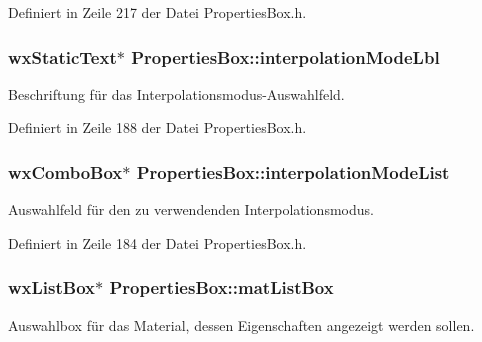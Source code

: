 Definiert in Zeile 217 der Datei Properties\-Box.\-h.

\hypertarget{classPropertiesBox_a7184c404a73e32cee30ac299ef9fe649}{
\subsubsection[{interpolation\-Mode\-Lbl}]{\setlength{\rightskip}{0pt plus 5cm}wx\-Static\-Text$\ast$ Properties\-Box\-::interpolation\-Mode\-Lbl\hspace{0.3cm}{\ttfamily [private]}}}\label{classPropertiesBox_a7184c404a73e32cee30ac299ef9fe649}
Beschriftung für das Interpolationsmodus-\/\-Auswahlfeld. 

Definiert in Zeile 188 der Datei Properties\-Box.\-h.

\hypertarget{classPropertiesBox_a3f5165a466fd9204f758a6fbb17507ae}{
\subsubsection[{interpolation\-Mode\-List}]{\setlength{\rightskip}{0pt plus 5cm}wx\-Combo\-Box$\ast$ Properties\-Box\-::interpolation\-Mode\-List\hspace{0.3cm}{\ttfamily [private]}}}\label{classPropertiesBox_a3f5165a466fd9204f758a6fbb17507ae}
Auswahlfeld für den zu verwendenden Interpolationsmodus. 

Definiert in Zeile 184 der Datei Properties\-Box.\-h.

\hypertarget{classPropertiesBox_affd4774a26bd75a30c1d1c07d02edd18}{
\subsubsection[{mat\-List\-Box}]{\setlength{\rightskip}{0pt plus 5cm}wx\-List\-Box$\ast$ Properties\-Box\-::mat\-List\-Box\hspace{0.3cm}{\ttfamily [private]}}}\label{classPropertiesBox_affd4774a26bd75a30c1d1c07d02edd18}
Auswahlbox für das Material, dessen Eigenschaften angezeigt werden sollen. 

